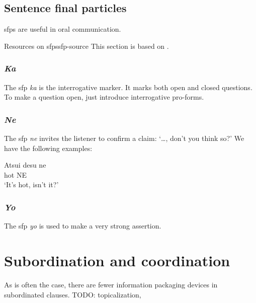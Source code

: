 \documentclass[UTF8, a4paper, oneside, scheme=plain]{ctexrep}
\newcommand*{\citesec}[1]{\S~{#1}}
\newcommand{\corpus}[1]{\emph{#1}}
\newcommand{\translate}[1]{`#1'}
\begin{document}
\section{Sentence final particles}\label{sec:sfp}

\ac{sfp}s are useful in oral communication.

\begin{infobox}{Resources on \ac{sfp}s}{sfp-source}
    This section is based on \citet[\citesec{6.4}]{akiyama2012japanese}.
\end{infobox}

\subsection{\corpus{Ka}}

The \ac{sfp} \corpus{ka} is the interrogative marker.
It marks both open and closed questions.
To make a question open,
just introduce interrogative pro-forms.

\subsection{\corpus{Ne}}

The \ac{sfp} \corpus{ne} invites the listener to confirm a claim:
\translate{\dots, don't you think so?}
We have the following examples:
\begin{exe}
    \ex \gll Atsui desu ne  \\
    hot {} NE  \\
    \glt \translate{It's hot, isn't it?}
\end{exe}

\subsection{\corpus{Yo}}

The \ac{sfp} \corpus{yo} is used to make a very strong assertion.

\chapter{Subordination and coordination}

As is often the case, there are fewer information packaging devices in subordinated clauses.
TODO: topicalization, 
\end{document}

